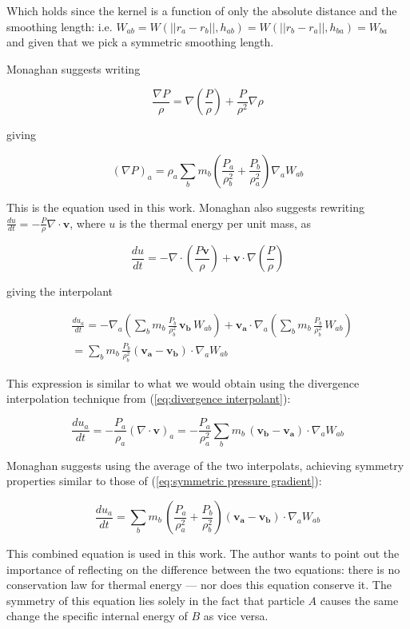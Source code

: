 \documentclass[../main.tex]{subfiles}
\begin{document}
Which holds since the kernel is a function of only the absolute distance and the smoothing length:
i.e. $W_{ab} = W(||r_a - r_b||, h_{ab}) = W(||r_b - r_a||, h_{ba}) = W_{ba}$ and given that we pick
a symmetric smoothing length.

Monaghan \autocite{monaghan1992} suggests writing

\begin{equation}
    \frac{\nabla P}{\rho} = \nabla (\frac{P}{\rho}) + \frac{P}{\rho^2} \nabla \rho
\end{equation}

giving

\begin{equation} \label{eq:symmetric pressure gradient}
    (\nabla P)_a = \rho_a \sum_b m_b (\frac{P_a}{\rho_b^2} + \frac{P_b}{\rho_a^2}) \nabla_a W_{ab}
\end{equation}

This is the equation used in this work. Monaghan also suggests rewriting $\frac{du}{dt} = -
\frac{P}{\rho} \nabla \cdot \bm{v}$, where $u$ is the thermal energy per unit mass, as

\begin{equation} \label{eq:2.19}
    \frac{du}{dt}
    = - \nabla \cdot (\frac{P\bm{v}}{\rho}) + \bm{v} \cdot \nabla (\frac{P}{\rho})
\end{equation}

giving the interpolant

\begin{equation}
\begin{aligned}
  & \frac{du_a}{dt}
  = - \nabla_a (\sum_b m_b \, \frac{P_b}{\rho_b^2} \, \bm{v_b} \, W_{ab})
  + \bm{v_a} \cdot \nabla_a (\sum_b m_b \, \frac{P_b}{\rho_b^2} \, W_{ab}) \\
  & = \sum_b m_b \, \frac{P_b}{\rho_b^2} (\bm{v_a} - \bm{v_b}) \cdot \nabla_a W_{ab}
\end{aligned}
\end{equation}

This expression is similar to what we would obtain using the divergence interpolation technique from
(\ref{eq:divergence interpolant}):

\begin{equation}
    \frac{du_a}{dt}
    = - \frac{P_a}{\rho_a} (\nabla \cdot \bm{v})_a
    = - \frac{P_a}{\rho_a^2} \sum_b m_b \, (\bm{v_b} - \bm{v_a}) \cdot \nabla_a W_{ab}
\end{equation}

Monaghan suggests using the average of the two interpolats, achieving symmetry properties similar to
those of (\ref{eq:symmetric pressure gradient}):

\begin{equation}
    \frac{du_a}{dt}
    = \sum_b m_b \, (\frac{P_a}{\rho_a^2} + \frac{P_b}{\rho_b^2}) (\bm{v_a} - \bm{v_b}) \cdot
    \nabla_a W_{ab}
\end{equation}

This combined equation is used in this work. The author wants to point out the importance of
reflecting on the difference between the two equations: there is no conservation law for thermal
energy --- nor does this equation conserve it. The symmetry of this equation lies solely in the fact
that particle $A$ causes the same change the specific internal energy of $B$ as vice versa.
\end{document}
